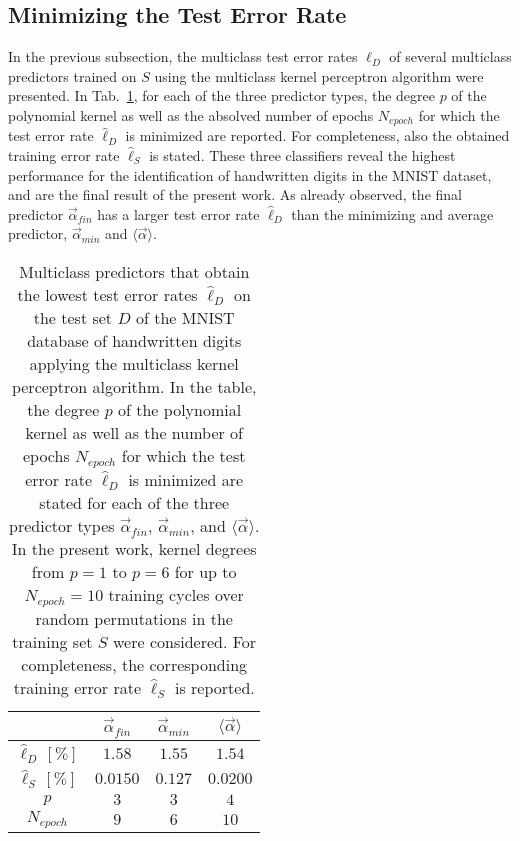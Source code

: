 \clearpage

\subsection{Minimizing the Test Error Rate}\label{subsec:best_pred}
In the previous subsection, the multiclass test error rates $\hat{\ell}_D$ of several multiclass predictors trained on $S$ using the multiclass kernel perceptron algorithm were presented. In Tab.~\ref{tab:min_test}, for each of the three predictor types, the degree $p$ of the polynomial kernel as well as the absolved number of epochs $N_{epoch}$ for which the test error rate $\hat{\ell}_D$ is minimized are reported. For completeness, also the obtained training error rate $\hat{\ell}_S$ is stated. These three classifiers reveal the highest performance for the identification of handwritten digits in the MNIST dataset, and are the final result of the present work. As already observed, the final predictor $\vec{\alpha}_{fin}$ has a larger test error rate $\hat{\ell}_D$ than the minimizing and average predictor, $\vec{\alpha}_{min}$ and $\langle\vec{\alpha}\rangle$.

\begin{table}[h!]
\centering
\begin{tabular}{c||c|c|c}
& $\vec{\alpha}_{fin}$ & $\vec{\alpha}_{min}$ & $\langle \vec{\alpha} \rangle$\\
\hline
\hline
$\hat{\ell}_D\,[\%]$ & \boldmath$1.58$ & \boldmath$1.55$ & \boldmath$1.54$\\
$\hat{\ell}_S\,[\%]$ & $0.0150$ & $0.127$ & $0.0200$ \\
$p$ & $3$ & $3$ & $4$\\
$N_{epoch}$ & $9$ & $6$ & $10$
\end{tabular}
\caption{Multiclass predictors that obtain the lowest test error rates $\hat{\ell}_D$ on the test set $D$ of the MNIST database of handwritten digits applying the multiclass kernel perceptron algorithm. In the table, the degree $p$ of the polynomial kernel as well as the number of epochs $N_{epoch}$ for which the test error rate $\hat{\ell}_D$ is minimized are stated for each of the three predictor types $\vec{\alpha}_{fin}$, $\vec{\alpha}_{min}$, and $\langle\vec{\alpha}\rangle$. In the present work, kernel degrees from $p=1$ to $p=6$ for up to $N_{epoch}=10$ training cycles over random permutations in the training set $S$ were considered. For completeness, the corresponding training error rate $\hat{\ell}_S$ is reported.}
\label{tab:min_test}
\end{table}

